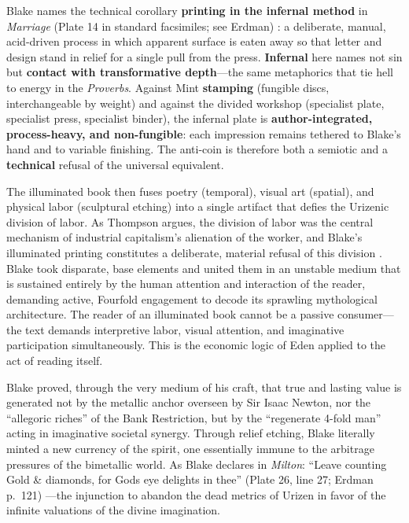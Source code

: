 \documentclass[
]{article}
\begin{document}
Blake names the technical corollary \textbf{printing in the infernal
method} in \emph{Marriage} (Plate 14 in standard facsimiles; see Erdman)
\citep{blake1790marriage, erdman1988complete}: a deliberate, manual,
acid-driven process in which apparent surface is eaten away so that
letter and design stand in relief for a single pull from the press.
\textbf{Infernal} here names not sin but \textbf{contact with
transformative depth}---the same metaphorics that tie hell to energy in
the \emph{Proverbs}. Against Mint \textbf{stamping} (fungible discs,
interchangeable by weight) and against the divided workshop (specialist
plate, specialist press, specialist binder), the infernal plate is
\textbf{author-integrated, process-heavy, and non-fungible}: each
impression remains tethered to Blake's hand and to variable finishing.
The anti-coin is therefore both a semiotic and a \textbf{technical}
refusal of the universal equivalent.

The illuminated book then fuses poetry (temporal), visual art (spatial),
and physical labor (sculptural etching) into a single artifact that
defies the Urizenic division of labor. As Thompson argues, the division
of labor was the central mechanism of industrial capitalism's alienation
of the worker, and Blake's illuminated printing constitutes a
deliberate, material refusal of this division
\citep{thompson1993witness}. Blake took disparate, base elements and
united them in an unstable medium that is sustained entirely by the
human attention and interaction of the reader, demanding active,
Fourfold engagement to decode its sprawling mythological architecture.
The reader of an illuminated book cannot be a passive consumer---the
text demands interpretive labor, visual attention, and imaginative
participation simultaneously. This is the economic logic of Eden applied
to the act of reading itself.

Blake proved, through the very medium of his craft, that true and
lasting value is generated not by the metallic anchor overseen by Sir
Isaac Newton, nor the ``allegoric riches'' of the Bank Restriction, but
by the ``regenerate 4-fold man'' acting in imaginative societal synergy.
Through relief etching, Blake literally minted a new currency of the
spirit, one essentially immune to the arbitrage pressures of the
bimetallic world. As Blake declares in \emph{Milton}: ``Leave counting
Gold \& diamonds, for Gods eye delights in thee'' (Plate 26, line 27;
Erdman p.~121) \citep{erdman1988complete}---the injunction to abandon
the dead metrics of Urizen in favor of the infinite valuations of the
divine imagination.
\end{document}
